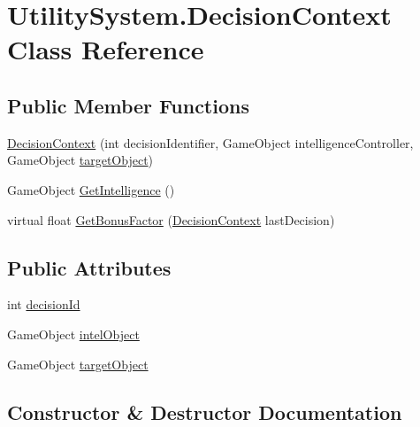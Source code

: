 \hypertarget{class_utility_system_1_1_decision_context}{}\section{Utility\+System.\+Decision\+Context Class Reference}
\label{class_utility_system_1_1_decision_context}
\subsection*{Public Member Functions}
\begin{DoxyCompactItemize}
\item 
\mbox{\hyperlink{class_utility_system_1_1_decision_context_a827706e37081745d5291660508b14df4}{Decision\+Context}} (int decision\+Identifier, Game\+Object intelligence\+Controller, Game\+Object \mbox{\hyperlink{class_utility_system_1_1_decision_context_ad7900272c03f4eca8fcabb15b76fe005}{target\+Object}})
\item 
Game\+Object \mbox{\hyperlink{class_utility_system_1_1_decision_context_a05391232347edeb491c3a918414a2bc7}{Get\+Intelligence}} ()
\item 
virtual float \mbox{\hyperlink{class_utility_system_1_1_decision_context_a811906f5fd74646edde4031a947e81c2}{Get\+Bonus\+Factor}} (\mbox{\hyperlink{class_utility_system_1_1_decision_context}{Decision\+Context}} last\+Decision)
\end{DoxyCompactItemize}
\subsection*{Public Attributes}
\begin{DoxyCompactItemize}
\item 
int \mbox{\hyperlink{class_utility_system_1_1_decision_context_a509cf4a0499cbe43a5758a4324e320ff}{decision\+Id}}
\item 
Game\+Object \mbox{\hyperlink{class_utility_system_1_1_decision_context_aa706423d7e4422c57926689c4f723a5d}{intel\+Object}}
\item 
Game\+Object \mbox{\hyperlink{class_utility_system_1_1_decision_context_ad7900272c03f4eca8fcabb15b76fe005}{target\+Object}}
\end{DoxyCompactItemize}


\subsection{Constructor \& Destructor Documentation}
\mbox{\label{class_utility_system_1_1_decision_context_a827706e37081745d5291660508b14df4}} 
